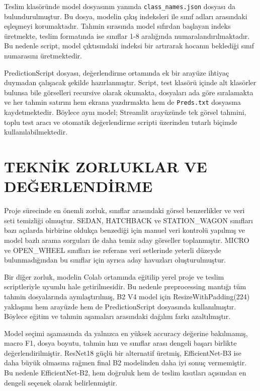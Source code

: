 \documentclass[conference]{IEEEtran}
\begin{document}
Teslim klasöründe model dosyasının yanında \texttt{class\_names.json}
dosyası da bulundurulmuştur. Bu dosya, modelin çıkış indeksleri ile sınıf
adları arasındaki eşleşmeyi korumaktadır. Tahmin sırasında model sıfırdan
başlayan indeks üretmekte, teslim formatında ise sınıflar 1-8 aralığında
numaralandırılmaktadır. Bu nedenle script, model çıktısındaki indeksi
bir artırarak hocanın beklediği sınıf numarasını üretmektedir.
\vspace{0.4cm}

PredictionScript dosyası, değerlendirme ortamında ek bir arayüze ihtiyaç
duymadan çalışacak şekilde hazırlanmıştır. Script, test klasörü içinde alt
klasörler bulunsa bile görselleri recursive olarak okumakta, dosyaları ada
göre sıralamakta ve her tahmin satırını hem ekrana yazdırmakta hem de
\texttt{Preds.txt} dosyasına kaydetmektedir. Böylece aynı model; Streamlit
arayüzünde tek görsel tahmini, toplu test aracı ve otomatik değerlendirme
scripti üzerinden tutarlı biçimde kullanılabilmektedir.

\section{TEKNİK ZORLUKLAR VE DEĞERLENDİRME}

Proje sürecinde en önemli zorluk, sınıflar arasındaki görsel benzerlikler
ve veri seti temizliği olmuştur. SEDAN, HATCHBACK ve STATION\_WAGON
sınıfları bazı açılarda birbirine oldukça benzediği için manuel veri
kontrolü yapılmış ve model bazlı arama sorguları ile daha temiz aday
görseller toplanmıştır. MICRO ve OPEN\_WHEEL sınıfları ise referans veri
setlerinde yeterli düzeyde bulunmadığından bu sınıflar için ayrıca aday
havuzları oluşturulmuştur.
\vspace{0.4cm}

Bir diğer zorluk, modelin Colab ortamında eğitilip yerel proje ve teslim
scriptleriyle uyumlu hale getirilmesidir. Bu nedenle preprocessing
mantığı tüm tahmin dosyalarında aynılaştırılmış, B2 V4 model için
ResizeWithPadding(224) yaklaşımı hem arayüzde hem de PredictionScript
dosyasında kullanılmıştır. Böylece eğitim ve tahmin aşamaları arasındaki
dağılım farkı azaltılmıştır.
\vspace{0.4cm}

Model seçimi aşamasında da yalnızca en yüksek accuracy değerine bakılmamış,
macro F1, dosya boyutu, tahmin hızı ve sınıflar arası dengeli başarı birlikte
değerlendirilmiştir. ResNet18 güçlü bir alternatif üretmiş, EfficientNet-B3
ise daha büyük olmasına rağmen final B2 modelinden daha iyi sonuç
vermemiştir. Bu nedenle EfficientNet-B2, hem doğruluk hem de teslim
kısıtları açısından en dengeli seçenek olarak belirlenmiştir.
\end{document}
